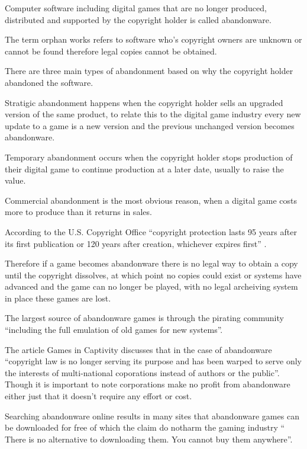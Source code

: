 \documentclass{scrartcl}
\begin{document}
Computer software including digital games that are no longer produced, distributed and supported by the copyright holder is called abandonware.

The term orphan works refers to software who's copyright owners are unknown or cannot be found therefore legal copies cannot be obtained.\cite{khong2006orphan}


There are three main types of abandonment based on why the copyright holder abandoned the software.

Stratigic abandonment happens when the copyright holder sells an upgraded version of the same product, to relate this to the digital game industry every new update to a game is a new version and the previous unchanged version becomes abandonware.

Temporary abandonment occurs when the copyright holder stops production of their digital game to continue production at a later date, usually to raise the value.

Commercial abandonment is the most obvious reason, when a digital game costs more to produce than it returns in sales. 

According to the U.S. Copyright Office ``copyright protection lasts 95 years after its first publication or 120 years after creation, whichever expires first'' \cite{gov}.

Therefore if a game becomes abandonware there is no legal way to obtain a copy until the copyright dissolves, at which point no copies could exist or systems have advanced and the game can no longer be played, with no legal archeiving system in place these games are lost\cite{gooding2008grand}.

The largest source of abandonware games is through the pirating community ``including the full emulation of old games for new systems''\cite{gooding2008grand}.

The article Games in Captivity discusses that in the case of abandonware ``copyright law is no longer serving its purpose and has been warped to serve only the interests of multi-national coporations instead of authors or the public''\cite{barton2005games}. Though it is important to note corporations make no profit from abandonware either just that it doesn't require any effort or cost.

Searching abandonware online results in many sites that abandonware games can be downloaded for free of which the claim do notharm the gaming industry `` There is no alternative to downloading them. You cannot buy them anywhere''\cite{barwick2008barriers}.
\end{document}
